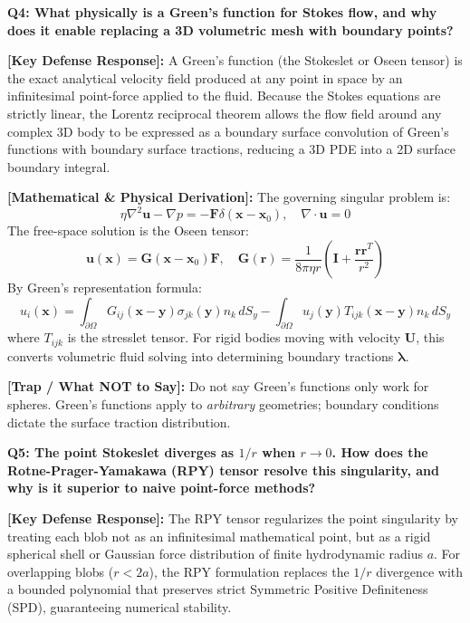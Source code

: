 \documentclass[11pt,a4paper]{article}
\newcommand{\question}[2]{
    \vspace{0.4cm}
    \noindent\colorbox{blue!10}{\parbox{\dimexpr\textwidth-2\fboxsep\relax}{
        \textbf{#1: #2}
    }}
    \vspace{0.2cm}
}
\newcommand{\shortanswer}[1]{
    \noindent\textbf{\textcolor{green!50!black}{[Key Defense Response]:}} #1
    \vspace{0.2cm}
}
\newcommand{\deepdetails}[1]{
    \noindent\textbf{\textcolor{blue!60!black}{[Mathematical \& Physical Derivation]:}} #1
    \vspace{0.2cm}
}
\newcommand{\pitfall}[1]{
    \noindent\textbf{\textcolor{red!70!black}{[Trap / What NOT to Say]:}} #1
    \vspace{0.3cm}
}
\begin{document}
\question{Q4}{What physically is a Green's function for Stokes flow, and why does it enable replacing a 3D volumetric mesh with boundary points?}

\shortanswer{A Green's function (the Stokeslet or Oseen tensor) is the exact analytical velocity field produced at any point in space by an infinitesimal point-force applied to the fluid. Because the Stokes equations are strictly linear, the Lorentz reciprocal theorem allows the flow field around any complex 3D body to be expressed as a boundary surface convolution of Green's functions with boundary surface tractions, reducing a 3D PDE into a 2D surface boundary integral.}

\deepdetails{
The governing singular problem is:
\begin{equation}
    \eta \nabla^2 \mathbf{u} - \nabla p = -\mathbf{F} \delta(\mathbf{x} - \mathbf{x}_0), \quad \nabla \cdot \mathbf{u} = 0
\end{equation}
The free-space solution is the Oseen tensor:
\begin{equation}
    \mathbf{u}(\mathbf{x}) = \mathbf{G}(\mathbf{x} - \mathbf{x}_0) \mathbf{F}, \quad \mathbf{G}(\mathbf{r}) = \frac{1}{8\pi\eta r} \left( \mathbf{I} + \frac{\mathbf{r}\mathbf{r}^T}{r^2} \right)
\end{equation}
By Green's representation formula:
\begin{equation}
    u_i(\mathbf{x}) = \int_{\partial \Omega} G_{ij}(\mathbf{x} - \mathbf{y}) \sigma_{jk}(\mathbf{y}) n_k \, dS_y - \int_{\partial \Omega} u_j(\mathbf{y}) T_{ijk}(\mathbf{x} - \mathbf{y}) n_k \, dS_y
\end{equation}
where $T_{ijk}$ is the stresslet tensor. For rigid bodies moving with velocity $\mathbf{U}$, this converts volumetric fluid solving into determining boundary tractions $\boldsymbol{\lambda}$.
}

\pitfall{Do not say Green's functions only work for spheres. Green's functions apply to \emph{arbitrary} geometries; boundary conditions dictate the surface traction distribution.}

\vspace{0.4cm}
\question{Q5}{The point Stokeslet diverges as $1/r$ when $r \to 0$. How does the Rotne-Prager-Yamakawa (RPY) tensor resolve this singularity, and why is it superior to naive point-force methods?}

\shortanswer{The RPY tensor regularizes the point singularity by treating each blob not as an infinitesimal mathematical point, but as a rigid spherical shell or Gaussian force distribution of finite hydrodynamic radius $a$. For overlapping blobs ($r < 2a$), the RPY formulation replaces the $1/r$ divergence with a bounded polynomial that preserves strict Symmetric Positive Definiteness (SPD), guaranteeing numerical stability.}
\end{document}
